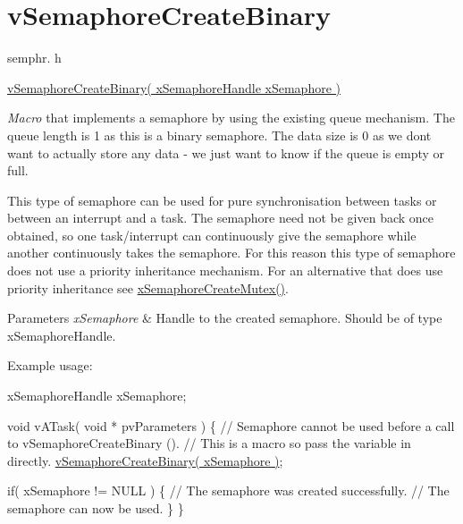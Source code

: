\hypertarget{group__vSemaphoreCreateBinary}{}\section{v\+Semaphore\+Create\+Binary}
\label{group__vSemaphoreCreateBinary}
semphr. h 
\begin{DoxyPre}\hyperlink{semphr_8h_ae10bffadd26fbd5bcce76bf33a83ef30}{vSemaphoreCreateBinary( xSemaphoreHandle xSemaphore )}\end{DoxyPre}


{\itshape Macro} that implements a semaphore by using the existing queue mechanism. The queue length is 1 as this is a binary semaphore. The data size is 0 as we don\textquotesingle{}t want to actually store any data -\/ we just want to know if the queue is empty or full.

This type of semaphore can be used for pure synchronisation between tasks or between an interrupt and a task. The semaphore need not be given back once obtained, so one task/interrupt can continuously \textquotesingle{}give\textquotesingle{} the semaphore while another continuously \textquotesingle{}takes\textquotesingle{} the semaphore. For this reason this type of semaphore does not use a priority inheritance mechanism. For an alternative that does use priority inheritance see \hyperlink{semphr_8h_aa6a00aa9b91a9e5b3ebe4ae1c3f115c6}{x\+Semaphore\+Create\+Mutex()}.


\begin{DoxyParams}{Parameters}
{\em x\+Semaphore} & Handle to the created semaphore. Should be of type x\+Semaphore\+Handle.\\
\hline
\end{DoxyParams}
Example usage\+: 
\begin{DoxyPre}
xSemaphoreHandle xSemaphore;\end{DoxyPre}



\begin{DoxyPre}void vATask( void * pvParameters )
\{
   // Semaphore cannot be used before a call to vSemaphoreCreateBinary ().
   // This is a macro so pass the variable in directly.
   \hyperlink{semphr_8h_ae10bffadd26fbd5bcce76bf33a83ef30}{vSemaphoreCreateBinary( xSemaphore )};\end{DoxyPre}



\begin{DoxyPre}   if( xSemaphore != NULL )
   \{
       // The semaphore was created successfully.
       // The semaphore can now be used.  
   \}
\}
\end{DoxyPre}
 
